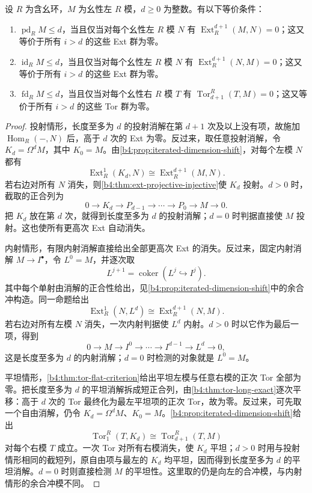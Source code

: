 \begin{theorem}\label{b4:thm:dimension-vanishing}
	设 \(R\) 为含幺环，\(M\) 为幺性左 \(R\) 模，\(d\ge0\) 为整数。有以下等价条件：
	\begin{enumerate}
		\item \(\operatorname{pd}_RM\le d\)，当且仅当对每个幺性左 \(R\) 模 \(N\) 有 \(\operatorname{Ext}_R^{d+1}(M,N)=0\)；这又等价于所有 \(i>d\) 的这些 Ext 群为零。
		\item \(\operatorname{id}_RM\le d\)，当且仅当对每个幺性左 \(R\) 模 \(N\) 有 \(\operatorname{Ext}_R^{d+1}(N,M)=0\)；这又等价于所有 \(i>d\) 的这些 Ext 群为零。
		\item \(\operatorname{fd}_RM\le d\)，当且仅当对每个幺性右 \(R\) 模 \(T\) 有 \(\operatorname{Tor}_{d+1}^R(T,M)=0\)；这又等价于所有 \(i>d\) 的这些 Tor 群为零。
	\end{enumerate}
\end{theorem}
\begin{proof}
	投射情形，长度至多为 \(d\) 的投射消解在第 \(d+1\) 次及以上没有项，故施加 \(\operatorname{Hom}_R(-,N)\) 后，高于 \(d\) 次的 Ext 为零。反过来，取任意投射消解，令 \(K_d=\Omega^dM\)，其中 \(K_0=M\)。由\cref{b4:prop:iterated-dimension-shift}，对每个左模 \(N\) 都有
	\[
		\operatorname{Ext}_R^1(K_d,N)\cong\operatorname{Ext}_R^{d+1}(M,N).
	\]
	若右边对所有 \(N\) 消失，则\cref{b4:thm:ext-projective-injective}使 \(K_d\) 投射。\(d>0\) 时，截取的正合列为
	\[
		0\longrightarrow K_d\longrightarrow P_{d-1}\longrightarrow\cdots \longrightarrow P_0\longrightarrow M\longrightarrow0.
	\]
	把 \(K_d\) 放在第 \(d\) 次，就得到长度至多为 \(d\) 的投射消解；\(d=0\) 时判据直接使 \(M\) 投射。这也使所有更高次 Ext 自动消失。

	内射情形，有限内射消解直接给出全部更高次 Ext 的消失。反过来，固定内射消解 \(M\to I^\bullet\)，令 \(L^0=M\)，并逐次取
	\[
		L^{j+1}=\operatorname{coker}(L^j\hookrightarrow I^j).
	\]
	其中每个单射由消解的正合性给出，见\cref{b4:prop:iterated-dimension-shift}中的余合冲构造。同一命题给出
	\[
		\operatorname{Ext}_R^1(N,L^d)\cong\operatorname{Ext}_R^{d+1}(N,M).
	\]
	若右边对所有左模 \(N\) 消失，一次内射判据使 \(L^d\) 内射。\(d>0\) 时以它作为最后一项，得到
	\[
		0\longrightarrow M\longrightarrow I^0\longrightarrow\cdots \longrightarrow I^{d-1}\longrightarrow L^d\longrightarrow0,
	\]
	这是长度至多为 \(d\) 的内射消解；\(d=0\) 时检测的对象就是 \(L^0=M\)。

	平坦情形，\cref{b4:thm:tor-flat-criterion}给出平坦左模与任意右模的正次 Tor 全部为零。把长度至多为 \(d\) 的平坦消解拆成短正合列，由\cref{b4:thm:tor-long-exact}逐次平移：高于 \(d\) 次的 Tor 最终化为最左平坦项的正次 Tor，故为零。反过来，可先取一个自由消解，仍令 \(K_d=\Omega^dM\)、\(K_0=M\)。\cref{b4:prop:iterated-dimension-shift}给出
	\[
		\operatorname{Tor}_1^R(T,K_d)\cong\operatorname{Tor}_{d+1}^R(T,M)
	\]
	对每个右模 \(T\) 成立。一次 Tor 对所有右模消失，使 \(K_d\) 平坦；\(d>0\) 时用与投射情形相同的截短列，原自由项与最左的 \(K_d\) 均平坦，因而得到长度至多为 \(d\) 的平坦消解。\(d=0\) 时则直接检测 \(M\) 的平坦性。这里取的仍是向左的合冲模，与内射情形的余合冲模不同。
\end{proof}

